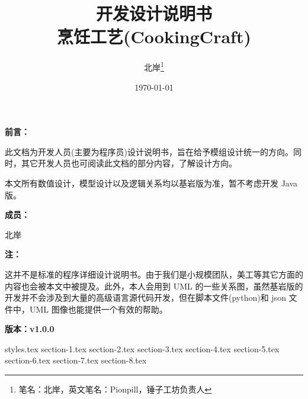 \documentclass{PionpillNote-book}
\title{\Huge{开发设计说明书} \\ \large{烹饪工艺(CookingCraft)}}
\author{
    北岸\footnote{笔名：北岸，英文笔名：Pionpill，锤子工坊负责人}
}
\date{\today}
\begin{document}
\maketitle                  %

\vspace{2cm}
\noindent\textbf{前言：}

此文档为开发人员(主要为程序员)设计说明书，旨在给予模组设计统一的方向。同时，其它开发人员也可阅读此文档的部分内容，了解设计方向。

本文所有数值设计，模型设计以及逻辑关系均以基岩版为准，暂不考虑开发 Java 版。

\noindent\textbf{成员：}

北岸

\noindent\textbf{注：}

这并不是标准的程序详细设计说明书。由于我们是小规模团队，美工等其它方面的内容也会被本文中被提及。此外，本人会用到 UML 的一些关系图，虽然基岩版的开发并不会涉及到大量的高级语言源代码开发，但在脚本文件(python)和 json 文件中，UML 图像也能提供一个有效的帮助。

\hfill \textbf{版本：v1.0.0}


\newpage
\tableofcontents            %
\thispagestyle{empty}
\newpage
\setcounter{page}{1}

{styles.tex}
{section-1.tex}
{section-2.tex}
{section-3.tex}
{section-4.tex}
{section-5.tex}
{section-6.tex}
{section-7.tex}
{section-8.tex}

\end{document}
